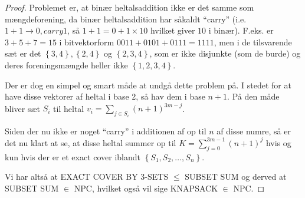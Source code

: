 \begin{proof}
Problemet er, at binær heltalsaddition ikke er det samme som mængdeforening, da binær heltalsaddition har såkaldt ``carry'' (i.e. $1 + 1 \rightarrow 0, carry 1$, så $1 + 1 = 0 + 1 \times 10$ hvilket giver $10$ i binær). F.eks. er $3+5+7=15$ i bitvektorform $0011 + 0101 + 0111 = 1111$, men i de tilsvarende sæt er det $\left\lbrace 3,4 \right\rbrace, \left\lbrace 2,4 \right\rbrace$ og $\left\lbrace 2,3,4 \right\rbrace$, som er ikke disjunkte (som de burde) og deres foreningsmængde heller ikke $\left\lbrace 1,2,3,4 \right\rbrace$.

Der er dog en simpel og smart måde at undgå dette problem på. I stedet for at have disse vektorer af heltal i base 2, så hav dem i base $n+1$. På den måde bliver sæt $S_i$ til heltal $v_i = \sum_{j \in S_i} (n+1)^{3m-j}$.

Siden der nu ikke er noget ``carry'' i additionen af op til $n$ af disse numre, så er det nu klart at se, at disse heltal summer op til $K = \sum_{j=0}^{3m-1} (n+1)^j$ hvis og kun hvis der er et exact cover iblandt $\left\lbrace S_1, S_2, \hdots, S_n \right\rbrace$.

Vi har altså at EXACT COVER BY 3-SETS $\leq$ SUBSET SUM og derved at SUBSET SUM $\in$ NPC, hvilket også vil sige KNAPSACK $\in$ NPC. 
\end{proof}

